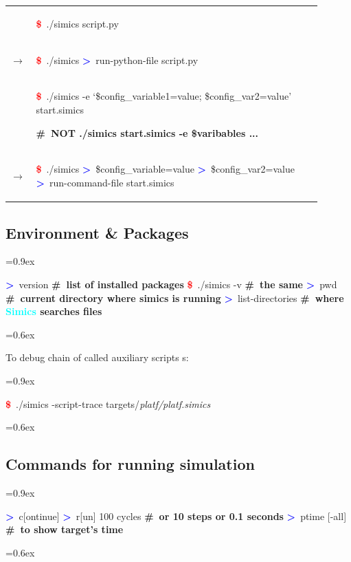 \documentclass[8pt]{extarticle}
\newcommand{\mywarning}{{\huge \warning}}
\newenvironment{code}[1][]{%
\begin{prebox}[#1]\obeylines%
\fontdimen2\font=0.9ex%
}{%
\end{prebox}%
\fontdimen2\font=0.6ex%
}
\newenvironment{codem}[2][\linewidth]{%
\begin{minipage}{#1}%
\begin{prebox}[colback=#2]\obeylines}{%
\end{prebox}%
\end{minipage}}
\newenvironment{code9}{%
\begin{codem}[0.9\linewidth]{green!10}}{\end{codem}}
\newcommand{\cod}[2][green!10]{\tcbox[
    size=fbox,
    on line,
    colback=#1,
    colframe=black,
    arc=0.3em  %
]{#2}}
\newcommand{\ind}{\hphantom{~~~}}
\newcommand{\prompt}{\textcolor{red}{\textbf{\$}\ }}
\newcommand{\sprompt}{\textcolor{blue}{\textbf{>}\ }}
\newcommand{\cmtcommon}[1]{\textcolor{Sepia}{\textbf{#1}}}
\newcommand{\cmt}[1]{\cmtcommon{\#\ #1}}
\newcommand{\p}[1]{\textit{\large#1}}
\newcommand{\Simics}{\textcolor{cyan}{\textbf{Simics}}}
\begin{document}
\begin{multicols*}{3}
\begin{tabular}{p{0.05\linewidth}p{0.85\linewidth}}
        & \begin{code9}
            \prompt ./simics script.py
        \end{code9}
        \vspace{0.05cm}
        \\
        $\longrightarrow$ &
        \begin{code9}
            \prompt ./simics
            \sprompt run-python-file script.py
        \end{code9}
        \vspace{0.2cm}
        \\

        & \begin{code9}
            \prompt ./simics -e ‘\$config_variable1=value; \$config_var2=value’ start.simics

            \cmt{\mywarning NOT ./simics start.simics -e \$varibables ...}
        \end{code9}
        \vspace{0.05cm}
        \\
        $\longrightarrow$ &
        \begin{code9}
            \prompt ./simics
            \sprompt \$config_variable=value
            \sprompt \$config_var2=value
            \sprompt run-command-file start.simics
        \end{code9}
    \end{tabular}

\subsection{Environment \& Packages}
    \begin{code}
        \sprompt version  \cmt{list of installed packages}
        \prompt ./simics -v \cmt{the same}
        \sprompt pwd \cmt{current directory where simics is running}
        \sprompt list-directories \cmt{where \Simics{} searches files}
    \end{code}


    To debug chain of called auxiliary scripts \cod{include}s:
    \begin{code}
        \prompt ./simics -script-trace targets/\p{platf/platf.simics}
    \end{code}

\subsection{Commands for running simulation}
\begin{code}
\sprompt c[ontinue]
\sprompt r[un] 100 cycles \ind \cmt{or 10 steps or 0.1 seconds}
\sprompt ptime [-all] \ind \cmt{to show target's time}
\end{code}


\end{multicols*}
\end{document}
